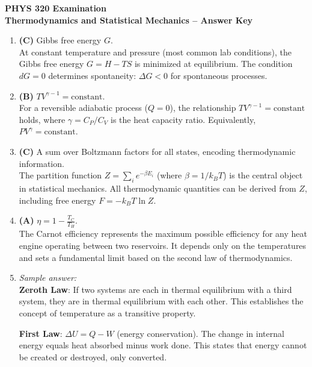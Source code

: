 \documentclass[11pt]{article}
\begin{document}
\begin{center}
  {\Large \textbf{PHYS 320 Examination}}\\[0.25em]
  {\large \textbf{Thermodynamics and Statistical Mechanics -- Answer Key}}\\[0.5em]
\end{center}

\begin{enumerate}[label=\textbf{\arabic*.}]

  \item \textbf{(C)} Gibbs free energy $G$.\\
  At constant temperature and pressure (most common lab conditions), the Gibbs free energy 
  $G = H - TS$ is minimized at equilibrium. The condition $dG = 0$ determines spontaneity: 
  $\Delta G < 0$ for spontaneous processes.

  \item \textbf{(B)} $TV^{\gamma-1} = \text{constant}$.\\
  For a reversible adiabatic process ($Q = 0$), the relationship $TV^{\gamma-1} = \text{constant}$ 
  holds, where $\gamma = C_P/C_V$ is the heat capacity ratio. Equivalently, $PV^\gamma = \text{constant}$.

  \item \textbf{(C)} A sum over Boltzmann factors for all states, encoding thermodynamic information.\\
  The partition function $Z = \sum_i e^{-\beta E_i}$ (where $\beta = 1/k_BT$) is the central object 
  in statistical mechanics. All thermodynamic quantities can be derived from $Z$, including free 
  energy $F = -k_B T \ln Z$.

  \item \textbf{(A)} $\eta = 1 - \frac{T_C}{T_H}$.\\
  The Carnot efficiency represents the maximum possible efficiency for any heat engine operating 
  between two reservoirs. It depends only on the temperatures and sets a fundamental limit based 
  on the second law of thermodynamics.

  \item \emph{Sample answer:}\\
  \textbf{Zeroth Law}: If two systems are each in thermal equilibrium with a third system, they are 
  in thermal equilibrium with each other. This establishes the concept of temperature as a transitive 
  property.

  \textbf{First Law}: $\Delta U = Q - W$ (energy conservation). The change in internal energy equals 
  heat absorbed minus work done. This states that energy cannot be created or destroyed, only converted.


\end{enumerate}
\end{document}
